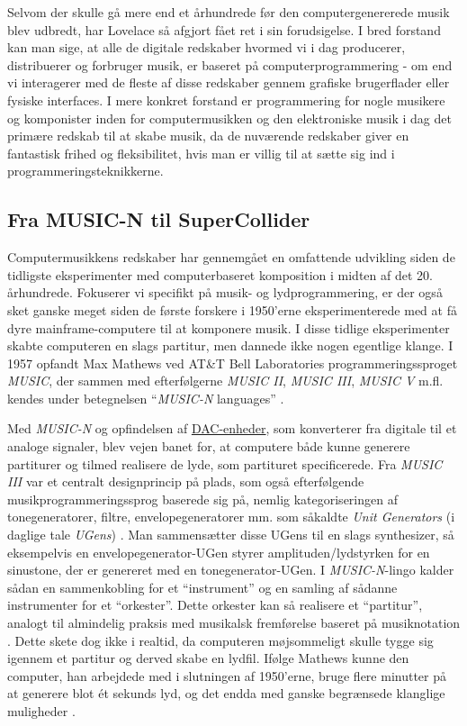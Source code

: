 Selvom der skulle gå mere end et århundrede før den computergenererede musik blev udbredt, har Lovelace så afgjort fået ret i sin forudsigelse. I bred forstand kan man sige, at alle de digitale redskaber hvormed vi i dag producerer, distribuerer og forbruger musik, er baseret på computerprogrammering - om end vi interagerer med de fleste af disse redskaber gennem grafiske brugerflader eller fysiske interfaces. I mere konkret forstand er programmering for nogle musikere og komponister inden for computermusikken og den elektroniske musik i dag det primære redskab til at skabe musik, da de nuværende redskaber giver en fantastisk frihed og fleksibilitet, hvis man er villig til at sætte sig ind i programmeringsteknikkerne.
\subsection{Fra MUSIC-N til SuperCollider}

Computermusikkens redskaber har gennemgået en omfattende udvikling siden de tidligste eksperimenter med computerbaseret komposition i midten af det 20. århundrede. Fokuserer vi specifikt på musik- og lydprogrammering, er der også sket ganske meget siden de første forskere i 1950'erne eksperimenterede med at få dyre mainframe-computere til at komponere musik. I disse tidlige eksperimenter skabte computeren en slags partitur, men dannede ikke nogen egentlige klange. I 1957 opfandt Max Mathews ved AT\&T Bell Laboratories programmeringssproget \textit{MUSIC}, der sammen med efterfølgerne \textit{MUSIC II}, \textit{MUSIC III}, \textit{MUSIC V} m.fl. kendes under betegnelsen \enquote{\textit{MUSIC-N} languages} \parencite[p. 61]{wang2017}.

Med \textit{MUSIC-N} og opfindelsen af \href{https://en.wikipedia.org/wiki/Digital-to-analog\_converter}{DAC-enheder}, som konverterer fra digitale til et analoge signaler, blev vejen banet for, at computere både kunne generere partiturer og tilmed realisere de lyde, som partituret specificerede. Fra \textit{MUSIC III} var et centralt designprincip på plads, som også efterfølgende musikprogrammeringssprog baserede sig på, nemlig kategoriseringen af tonegeneratorer, filtre, envelopegeneratorer mm. som såkaldte \textit{Unit Generators} (i daglige tale \textit{UGens}) \parencite[p. 61]{wang2017}. Man sammensætter disse UGens til en slags synthesizer, så eksempelvis en envelopegenerator-UGen styrer amplituden/lydstyrken for en sinustone, der er genereret med en tonegenerator-UGen. I \textit{MUSIC-N}-lingo kalder sådan en sammenkobling for et \enquote{instrument} og en samling af sådanne instrumenter for et \enquote{orkester}. Dette orkester kan så realisere et \enquote{partitur}, analogt til almindelig praksis med musikalsk fremførelse baseret på musiknotation \parencite[p. 61]{wang2017}. Dette skete dog ikke i realtid, da computeren møjsommeligt skulle tygge sig igennem et partitur og derved skabe en lydfil. Ifølge Mathews kunne den computer, han arbejdede med i slutningen af 1950'erne, bruge flere minutter på at generere blot ét sekunds lyd, og det endda med ganske begrænsede klanglige muligheder \parencite[p. 84]{collins2017a}.

